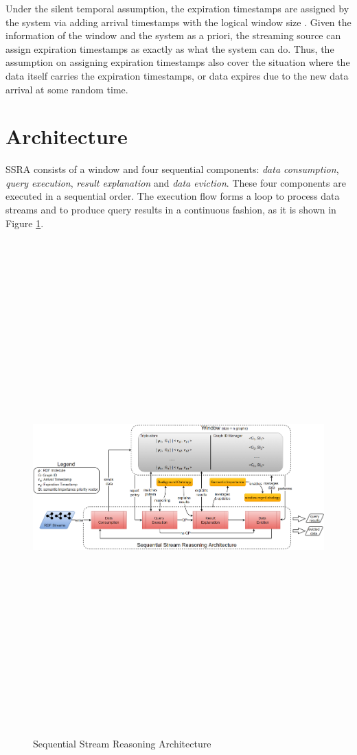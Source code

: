 Under the silent temporal assumption, the expiration timestamps are assigned by the system via adding arrival timestamps with the logical window size \cite{barbieri2010incremental}. 
Given the information of the window and the system as a priori, the streaming source can assign expiration timestamps as exactly as what the system can do. 
Thus, the assumption on assigning expiration timestamps also cover the situation where the data itself carries the expiration timestamps, or data expires due to the new data arrival at some random time. 
%
\section{Architecture}
SSRA consists of a window and four sequential components: \textit{data consumption}, \textit{query execution}, \textit{result explanation} and \textit{data eviction}.
These four components are executed in a sequential order. 
The execution flow forms a loop to process data streams and to produce query results in a continuous fashion, as it is shown in Figure \ref{fig:4-ssra}. 

\begin{figure}[!htbp]
	\centering
	\includegraphics[angle=90,height=7.5in]{img/4-ssra.png}
	\caption{Sequential Stream Reasoning Architecture}
	\label{fig:4-ssra}
\end{figure}

